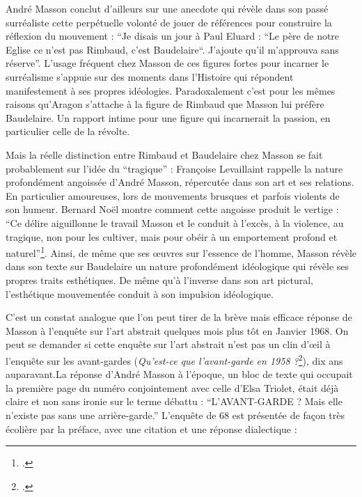 	 André Masson conclut d’ailleurs sur une anecdote qui révèle dans son passé surréaliste cette perpétuelle volonté de jouer de références pour construire la réflexion du mouvement : \enquote{Je disais un jour à Paul Eluard : “Le père de notre Eglise ce n’est pas Rimbaud, c’est Baudelaire“. J’ajoute qu’il m’approuva sans réserve}. L'usage fréquent chez Masson de ces figures fortes pour incarner le surréalisme s’appuie sur des moments dans l’Histoire qui répondent manifestement à ses propres idéologies. Paradoxalement c’est pour les mêmes raisons qu’Aragon s’attache à la figure de Rimbaud que Masson lui préfère Baudelaire. Un rapport intime pour une figure qui incarnerait la passion, en particulier celle de la révolte. 

	Mais la réelle distinction entre Rimbaud et Baudelaire chez Masson se fait probablement sur l’idée du \enquote{tragique} : Françoise Levaillaint rappelle la nature profondément angoissée d’André Masson, répercutée dans son art et ses relations. En particulier amoureuses, lors de mouvements brusques et parfois violents de son humeur. Bernard Noël montre comment cette angoisse produit le vertige : \enquote{Ce délire aiguillonne le travail Masson et le conduit à l’excès, à la violence, au tragique, non pour les cultiver, mais pour obéir à un emportement profond et naturel}\footcite[p83]{noel}.  Ainsi, de même que ses \oe{}uvres sur l’essence de l’homme, Masson révèle dans son texte sur Baudelaire un nature profondément idéologique qui révèle ses propres traits esthétiques. De même qu’à l’inverse dans son art pictural, l’esthétique mouvementée conduit à son impulsion idéologique. 

C’est un constat analogue que l’on peut tirer de la brève mais efficace réponse de Masson à l’enquête sur l’art abstrait quelques mois plus tôt en Janvier 1968. On peut se demander si cette enquête sur l’art abstrait n’est pas un clin d’\oe{}il à l’enquête sur les avant-gardes (\emph{Qu’est-ce que l’avant-garde en 1958 ?}\footcite{avantgarde}), dix ans auparavant.La réponse d’André Masson à l’époque, un bloc de texte qui occupait la première page du numéro conjointement avec celle d’Elsa Triolet, était déjà claire et non sans ironie sur le terme débattu : \enquote{L’AVANT-GARDE ? Mais elle n’existe pas sans une arrière-garde.} L’enquête de 68 est présentée de façon très écolière par la préface, avec une citation et une réponse dialectique : 

